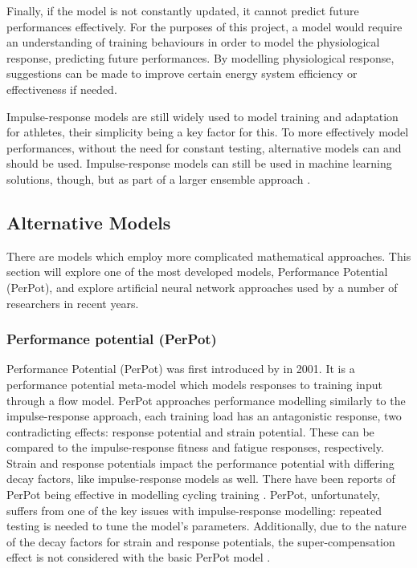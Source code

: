 Finally, if the model is not constantly updated, it cannot predict future performances effectively. For the purposes of this project, a model would require an understanding of training behaviours in order to model the physiological response, predicting future performances. By modelling physiological response, suggestions can be made to improve certain energy system efficiency or effectiveness if needed. 

Impulse-response models are still widely used to model training and adaptation for athletes, their simplicity being a key factor for this. To more effectively model performances, without the need for constant testing, alternative models can and should be used. Impulse-response models can still be used in machine learning solutions, though, but as part of a larger ensemble approach \cite{Imbach2022}.

\subsection{Alternative Models}
There are models which employ more complicated mathematical approaches. This section will explore one of the most developed models, Performance Potential (PerPot), and explore artificial neural network approaches used by a number of researchers in recent years.

\subsubsection{Performance potential (PerPot)}
Performance Potential (PerPot) was first introduced by \textcite{perl2001} in 2001. It is a performance potential meta-model which models responses to training input through a flow model. PerPot approaches performance modelling similarly to the impulse-response approach, each training load has an antagonistic response, two contradicting effects: response potential and strain potential. These can be compared to the impulse-response fitness and fatigue responses, respectively. Strain and response potentials impact the performance potential with differing decay factors, like impulse-response models as well. There have been reports of PerPot being effective in modelling cycling training \cite{Churchill2014}. PerPot, unfortunately, suffers from one of the key issues with impulse-response modelling: repeated testing is needed to tune the model's parameters. Additionally, due to the nature of the decay factors for strain and response potentials, the super-compensation effect is not considered with the basic PerPot model \cite{Churchill2014}. 

